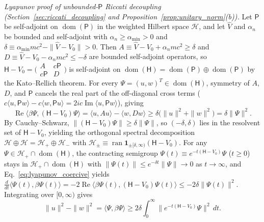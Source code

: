 \documentclass[aps,prd,onecolumn,tightenlines,nofootinbib,notitlepage,11pt,floatfix]{revtex4-2}
\theoremstyle{indentedtheorem}
\begin{document}
\emph{Lyapunov proof of unbounded-$\mathsf{P}$ Riccati decoupling (Section~\ref{sec:riccati_decoupling} and Proposition~\ref{prop:unitary_norm}(b)).}
Let $\mathsf{P}$ be self-adjoint on $\operatorname{dom}(\mathsf{P})$ in the weighted Hilbert space $\mathcal{H}$, and let $\hat{V}$ and $\alpha_n$ be bounded and self-adjoint with $\alpha_n\ge\alpha_{\min}>0$ and $\delta\equiv\alpha_{\min}mc^2-\|\hat{V}-V_0\|>0$. Then $A\equiv\hat{V}-V_0+\alpha_n mc^2\ge\delta$ and $D\equiv\hat{V}-V_0-\alpha_n mc^2\le -\delta$ are bounded self-adjoint operators, so $\mathsf{H}-V_0 = \bigl(\begin{smallmatrix}A & c\mathsf{P}\\ c\mathsf{P} & D\end{smallmatrix}\bigr)$ is self-adjoint on $\operatorname{dom}(\mathsf{H})=\operatorname{dom}(\mathsf{P})\oplus\operatorname{dom}(\mathsf{P})$ by the Kato--Rellich theorem. For every $\Psi=(u,w)^T\in\operatorname{dom}(\mathsf{H})$, symmetry of $A$, $D$, and $\mathsf{P}$ cancels the real part of the off-diagonal cross terms ($c\langle u,\mathsf{P}w\rangle - c\langle w,\mathsf{P}u\rangle = 2ic\operatorname{Im}\langle u,\mathsf{P}w\rangle$), giving
\begin{equation}
    \operatorname{Re}\langle\beta\Psi,(\mathsf{H}-V_0)\Psi\rangle = \langle u,Au\rangle - \langle w,Dw\rangle \ge \delta\big(\|u\|^2+\|w\|^2\big) = \delta\|\Psi\|^2 .
    \label{eq:lyapunov_coercive}
\end{equation}
By Cauchy--Schwarz, $\|(\mathsf{H}-V_0)\Psi\|\ge\delta\|\Psi\|$, so $(-\delta,\delta)$ lies in the resolvent set of $\mathsf{H}-V_0$, yielding the orthogonal spectral decomposition $\mathcal{H}\oplus\mathcal{H} = \mathcal{H}_+\oplus\mathcal{H}_-$ with $\mathcal{H}_\pm \equiv \operatorname{ran}\mathbf{1}_{\pm[\delta,\infty)}(\mathsf{H}-V_0)$. For any $\Psi\in\mathcal{H}_+\cap\operatorname{dom}(\mathsf{H})$, the contracting semigroup $\Psi(t)\equiv e^{-t(\mathsf{H}-V_0)}\Psi$ ($t\ge 0$) stays in $\mathcal{H}_+\cap\operatorname{dom}(\mathsf{H})$ with $\|\Psi(t)\|\le e^{-\delta t}\|\Psi\|\to 0$ as $t\to\infty$, and Eq.~\eqref{eq:lyapunov_coercive} yields $\frac{d}{dt}\langle\Psi(t),\beta\Psi(t)\rangle = -2\operatorname{Re}\langle\beta\Psi(t),(\mathsf{H}-V_0)\Psi(t)\rangle \le -2\delta\|\Psi(t)\|^2$. Integrating over $[0,\infty)$ gives
\begin{equation}
    \|u\|^2 - \|w\|^2 = \langle\Psi,\beta\Psi\rangle \ge 2\delta\int_0^\infty \big\|e^{-t(\mathsf{H}-V_0)}\Psi\big\|^2\,dt .
    \label{eq:lyapunov_gap}
\end{equation}
\end{document}
